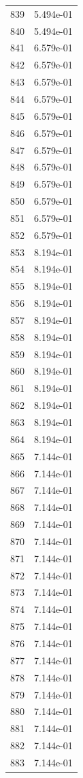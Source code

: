 \documentclass[12pt]{article}
\begin{document}
\begin{longtable}{@{}cc@{}}
839 & 5.494e-01 \\
840 & 5.494e-01 \\
841 & 6.579e-01 \\
842 & 6.579e-01 \\
843 & 6.579e-01 \\
844 & 6.579e-01 \\
845 & 6.579e-01 \\
846 & 6.579e-01 \\
847 & 6.579e-01 \\
848 & 6.579e-01 \\
849 & 6.579e-01 \\
850 & 6.579e-01 \\
851 & 6.579e-01 \\
852 & 6.579e-01 \\
853 & 8.194e-01 \\
854 & 8.194e-01 \\
855 & 8.194e-01 \\
856 & 8.194e-01 \\
857 & 8.194e-01 \\
858 & 8.194e-01 \\
859 & 8.194e-01 \\
860 & 8.194e-01 \\
861 & 8.194e-01 \\
862 & 8.194e-01 \\
863 & 8.194e-01 \\
864 & 8.194e-01 \\
865 & 7.144e-01 \\
866 & 7.144e-01 \\
867 & 7.144e-01 \\
868 & 7.144e-01 \\
869 & 7.144e-01 \\
870 & 7.144e-01 \\
871 & 7.144e-01 \\
872 & 7.144e-01 \\
873 & 7.144e-01 \\
874 & 7.144e-01 \\
875 & 7.144e-01 \\
876 & 7.144e-01 \\
877 & 7.144e-01 \\
878 & 7.144e-01 \\
879 & 7.144e-01 \\
880 & 7.144e-01 \\
881 & 7.144e-01 \\
882 & 7.144e-01 \\
883 & 7.144e-01 \\

\end{longtable}
\end{document}
